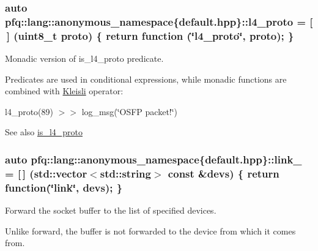 \subsubsection[{\texorpdfstring{l4\+\_\+proto}{l4_proto}}]{\setlength{\rightskip}{0pt plus 5cm}auto pfq\+::lang\+::anonymous\+\_\+namespace\{default.\+hpp\}\+::l4\+\_\+proto = \mbox{[}$\,$\mbox{]} (uint8\+\_\+t proto) \{ return {\bf function} (\char`\"{}l4\+\_\+proto\char`\"{}, proto); \}}\hypertarget{namespacepfq_1_1lang_1_1anonymous__namespace_02default_8hpp_03_a8ad2208c91dc3cd4378e715aab5fb4b7}{}\label{namespacepfq_1_1lang_1_1anonymous__namespace_02default_8hpp_03_a8ad2208c91dc3cd4378e715aab5fb4b7}


Monadic version of {\ttfamily is\+\_\+l4\+\_\+proto} predicate. 

Predicates are used in conditional expressions, while monadic functions are combined with \hyperlink{structpfq_1_1lang_1_1Kleisli}{Kleisli} operator\+:

l4\+\_\+proto(89) $>$$>$ log\+\_\+msg(\char`\"{}\+O\+S\+F\+P packet!\char`\"{})

\begin{DoxySeeAlso}{See also}
\hyperlink{namespacepfq_1_1lang_1_1anonymous__namespace_02default_8hpp_03_a9d06d4dedca1ebdc3b270cb2f3e9e42b}{is\+\_\+l4\+\_\+proto} 
\end{DoxySeeAlso}
\subsubsection[{\texorpdfstring{link\+\_\+}{link_}}]{\setlength{\rightskip}{0pt plus 5cm}auto pfq\+::lang\+::anonymous\+\_\+namespace\{default.\+hpp\}\+::link\+\_\+ = \mbox{[}$\,$\mbox{]} (std\+::vector$<$std\+::string$>$ const \&devs) \{ return {\bf function}(\char`\"{}link\char`\"{}, devs); \}}\hypertarget{namespacepfq_1_1lang_1_1anonymous__namespace_02default_8hpp_03_aaad98f847b8e4c53a5ddec3c93b05296}{}\label{namespacepfq_1_1lang_1_1anonymous__namespace_02default_8hpp_03_aaad98f847b8e4c53a5ddec3c93b05296}


Forward the socket buffer to the list of specified devices. 

Unlike forward, the buffer is not forwarded to the device from which it comes from.

